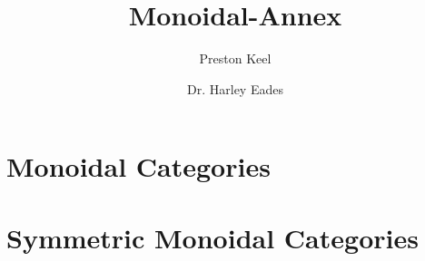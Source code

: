 \documentclass[11pt]{article}
\title{Monoidal-Annex}
\author{Preston Keel \and Dr. Harley Eades}
\begin{document}
\maketitle
\tableofcontents

\section{Monoidal Categories}
\label{sec:monoidal_categories}


\section{Symmetric Monoidal Categories}
\label{sec:symmetric_monoidal_categories}

\end{document}
